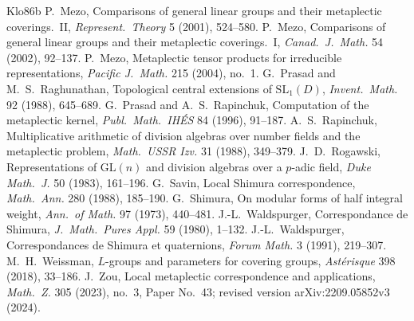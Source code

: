 \documentclass[12pt]{article}
\newcommand{\GL}{\mathrm{GL}}
\theoremstyle{plain}
\theoremstyle{definition}
\begin{document}
\begin{thebibliography}{Klo86b}
 P.~Mezo, Comparisons of general linear groups and their metaplectic coverings.\ II, \emph{Represent.\ Theory} 5 (2001), 524--580.
 P.~Mezo, Comparisons of general linear groups and their metaplectic coverings.\ I, \emph{Canad.\ J.\ Math.} 54 (2002), 92--137.
 P.~Mezo, Metaplectic tensor products for irreducible representations, \emph{Pacific J.\ Math.} 215 (2004), no.~1.
 G.~Prasad and M.~S.~Raghunathan, Topological central extensions of $\mathrm{SL}_1(D)$, \emph{Invent.\ Math.} 92 (1988), 645--689.
 G.~Prasad and A.~S.~Rapinchuk, Computation of the metaplectic kernel, \emph{Publ.\ Math.\ IH\'ES} 84 (1996), 91--187.
 A.~S.~Rapinchuk, Multiplicative arithmetic of division algebras over number fields and the metaplectic problem, \emph{Math.\ USSR Izv.} 31 (1988), 349--379.
 J.~D.~Rogawski, Representations of $\GL(n)$ and division algebras over a $p$-adic field, \emph{Duke Math.\ J.} 50 (1983), 161--196.
 G.~Savin, Local Shimura correspondence, \emph{Math.\ Ann.} 280 (1988), 185--190.
 G.~Shimura, On modular forms of half integral weight, \emph{Ann.\ of Math.} 97 (1973), 440--481.
 J.-L.~Waldspurger, Correspondance de Shimura, \emph{J.\ Math.\ Pures Appl.} 59 (1980), 1--132.
 J.-L.~Waldspurger, Correspondances de Shimura et quaternions, \emph{Forum Math.} 3 (1991), 219--307.
 M.~H.~Weissman, $L$-groups and parameters for covering groups, \emph{Ast\'erisque} 398 (2018), 33--186.
 J.~Zou, Local metaplectic correspondence and applications, \emph{Math.\ Z.} 305 (2023), no.~3, Paper No.~43; revised version arXiv:2209.05852v3 (2024).
\end{thebibliography}
\end{document}
